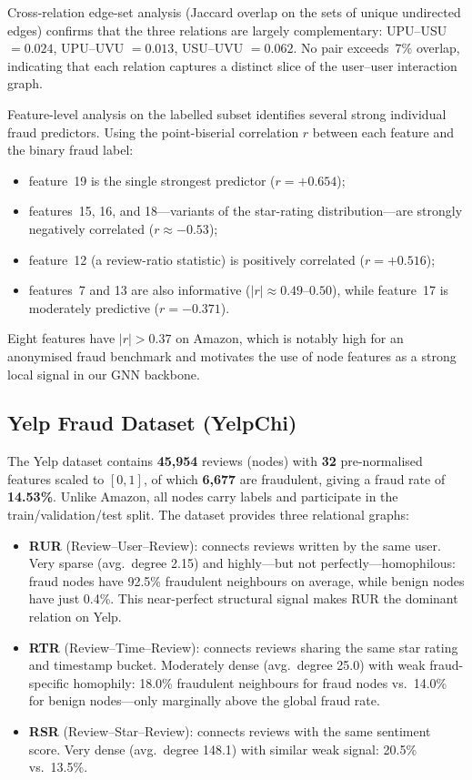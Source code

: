 Cross-relation edge-set analysis (Jaccard overlap on the sets of unique undirected edges) confirms that the three relations are largely complementary: UPU--USU $= 0.024$, UPU--UVU $= 0.013$, USU--UVU $= 0.062$. No pair exceeds~$7\%$ overlap, indicating that each relation captures a distinct slice of the user--user interaction graph.

Feature-level analysis on the labelled subset identifies several strong individual fraud predictors. Using the point-biserial correlation $r$ between each feature and the binary fraud label:

\begin{itemize}
    \item feature~19 is the single strongest predictor ($r = +0.654$);
    \item features~15, 16, and 18---variants of the star-rating distribution---are strongly negatively correlated ($r \approx -0.53$);
    \item feature~12 (a review-ratio statistic) is positively correlated ($r = +0.516$);
    \item features~7 and 13 are also informative ($|r| \approx 0.49$--$0.50$), while feature~17 is moderately predictive ($r = -0.371$).
\end{itemize}

Eight features have $|r| > 0.37$ on Amazon, which is notably high for an anonymised fraud benchmark and motivates the use of node features as a strong local signal in our GNN backbone.

\subsection{Yelp Fraud Dataset (YelpChi)}

The Yelp dataset contains \textbf{45{,}954} reviews (nodes) with \textbf{32} pre-normalised features scaled to $[0, 1]$, of which \textbf{6{,}677} are fraudulent, giving a fraud rate of \textbf{14.53\%}. Unlike Amazon, all nodes carry labels and participate in the train/validation/test split. The dataset provides three relational graphs:

\begin{itemize}
    \item \textbf{RUR} (Review--User--Review): connects reviews written by the same user. Very sparse (avg.\ degree 2.15) and highly---but not perfectly---homophilous: fraud nodes have 92.5\% fraudulent neighbours on average, while benign nodes have just 0.4\%. This near-perfect structural signal makes RUR the dominant relation on Yelp.
    \item \textbf{RTR} (Review--Time--Review): connects reviews sharing the same star rating and timestamp bucket. Moderately dense (avg.\ degree 25.0) with weak fraud-specific homophily: 18.0\% fraudulent neighbours for fraud nodes vs.\ 14.0\% for benign nodes---only marginally above the global fraud rate.
    \item \textbf{RSR} (Review--Star--Review): connects reviews with the same sentiment score. Very dense (avg.\ degree 148.1) with similar weak signal: 20.5\% vs.\ 13.5\%.
\end{itemize}

